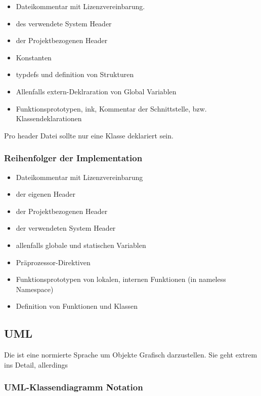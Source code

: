 \begin{itemize}[itemsep=1pt, parsep=0pt]
    \item Dateikommentar mit Lizenzvereinbarung.
    \item {} des verwendete System Header
    \item {} der Projektbezogenen Header
    \item Konstanten
    \item typdefs und definition von Strukturen
    \item Allenfalls extern-Deklraration von Global Variablen
    \item Funktionsprototypen, ink, Kommentar der Schnittstelle, bzw. Klassendeklarationen
\end{itemize}

Pro header Datei sollte nur eine Klasse deklariert sein.

\subsubsection{Reihenfolger der Implementation}

\begin{itemize}[itemsep=1pt, parsep=0pt]
    \item Dateikommentar mit Lizenzvereinbarung
    \item {} der eigenen Header
    \item {} der Projektbezogenen Header
    \item {} der verwendeten System Header
    \item allenfalls globale und statischen Variablen
    \item Präprozessor-Direktiven
    \item Funktionsprototypen von lokalen, internen Funktionen (in nameless Namespace)
    \item Definition von Funktionen und Klassen
\end{itemize}

\subsection{UML}

Die  ist eine normierte Sprache um Objekte Grafisch darzustellen. 
Sie geht extrem ins Detail, allerdings 

\subsubsection{UML-Klassendiagramm Notation}

